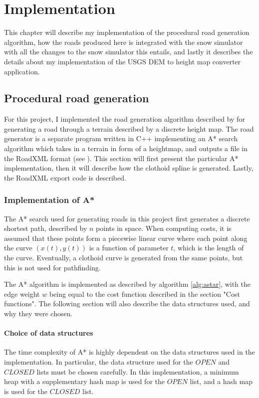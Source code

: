 \chapter{Implementation}
\label{chap:implementation}
This chapter will describe my implementation of the procedural road generation algorithm, how the roads produced here is integrated with the snow simulator with all the changes to the snow simulator this entails, and lastly it describes the details about my implementation of the USGS DEM to height map converter application.

\section{Procedural road generation}
For this project, I implemented the road generation algorithm described by \cite{roadgen} for generating a road through a terrain described by a discrete height map. The road generator is a separate program written in C++ implementing an A* search algorithm which takes in a terrain in form of a heightmap, and outputs a file in the RoadXML format (see \cite{roadxml}). This section will first present the particular A* implementation, then it will describe how the clothoid spline is generated. Lastly, the RoadXML export code is described. 

\subsection{Implementation of A*}
\label{sec:impl_astar}
The A* search used for generating roads in this project first generates a discrete shortest path, described by $n$ points in space. When computing costs, it is assumed that these points form a piecewise linear curve where each point along the curve $(x(t), y(t))$ is a function of parameter $t$, which is the length of the curve. Eventually, a clothoid curve is generated from the same points, but this is not used for pathfinding.

The A* algorithm is implemented as described by algorithm \ref{alg:astar}, with the edge weight $w$ being equal to the cost function described in the section "Cost functions". The following section will also describe the data structures used, and why they were chosen. 

\subsubsection{Choice of data structures}
The time complexity of A* is highly dependent on the data structures used in the implementation. In particular, the data structure used for the $OPEN$ and $CLOSED$ lists must be chosen carefully. In this implementation, a minimum heap with a supplementary hash map is used for the $OPEN$ list, and a hash map is used for the $CLOSED$ list.

